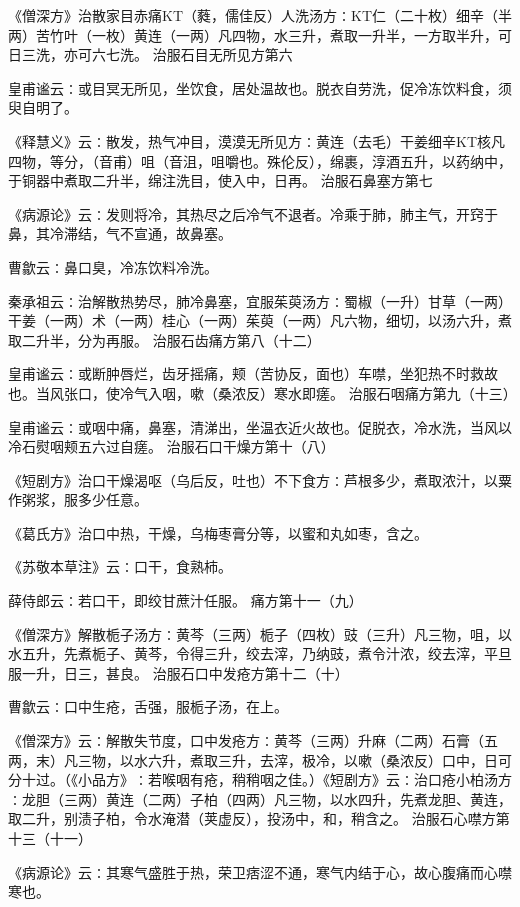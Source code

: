 \documentclass[a4paper,12pt,UTF8,twoside]{ctexbook}
\begin{document}
《僧深方》治散家目赤痛KT（蕤，儒佳反）人洗汤方∶KT仁（二十枚）细辛（半两）苦竹叶（一枚）黄连（一两）凡四物，水三升，煮取一升半，一方取半升，可日三洗，亦可六七洗。
治服石目无所见方第六

皇甫谧云∶或目冥无所见，坐饮食，居处温故也。脱衣自劳洗，促冷冻饮料食，须臾自明了。

《释慧义》云∶散发，热气冲目，漠漠无所见方∶黄连（去毛）干姜细辛KT核凡四物，等分，（音甫）咀（音沮，咀嚼也。殊伦反），绵裹，淳酒五升，以药纳中，于铜器中煮取二升半，绵注洗目，使入中，日再。
治服石鼻塞方第七

《病源论》云∶发则将冷，其热尽之后冷气不退者。冷乘于肺，肺主气，开窍于鼻，其冷滞结，气不宣通，故鼻塞。

曹歙云∶鼻口臭，冷冻饮料冷洗。

秦承祖云∶治解散热势尽，肺冷鼻塞，宜服茱萸汤方∶蜀椒（一升）甘草（一两）干姜（一两）术（一两）桂心（一两）茱萸（一两）凡六物，细切，以汤六升，煮取二升半，分为再服。
治服石齿痛方第八（十二）

皇甫谧云∶或断肿唇烂，齿牙摇痛，颊（苦协反，面也）车噤，坐犯热不时救故也。当风张口，使冷气入咽，嗽（桑浓反）寒水即瘥。
治服石咽痛方第九（十三）

皇甫谧云∶或咽中痛，鼻塞，清涕出，坐温衣近火故也。促脱衣，冷水洗，当风以冷石熨咽颊五六过自瘥。
治服石口干燥方第十（八）

《短剧方》治口干燥渴呕（乌后反，吐也）不下食方∶芦根多少，煮取浓汁，以粟作粥浆，服多少任意。

《葛氏方》治口中热，干燥，乌梅枣膏分等，以蜜和丸如枣，含之。

《苏敬本草注》云∶口干，食熟柿。

薛侍郎云∶若口干，即绞甘蔗汁任服。
痛方第十一（九）

《僧深方》解散栀子汤方∶黄芩（三两）栀子（四枚）豉（三升）凡三物，咀，以水五升，先煮栀子、黄芩，令得三升，绞去滓，乃纳豉，煮令汁浓，绞去滓，平旦服一升，日三，甚良。
治服石口中发疮方第十二（十）

曹歙云∶口中生疮，舌强，服栀子汤，在上。

《僧深方》云∶解散失节度，口中发疮方∶黄芩（三两）升麻（二两）石膏（五两，末）凡三物，以水六升，煮取三升，去滓，极冷，以嗽（桑浓反）口中，日可分十过。（《小品方》∶若喉咽有疮，稍稍咽之佳。）《短剧方》云∶治口疮小柏汤方∶龙胆（三两）黄连（二两）子柏（四两）凡三物，以水四升，先煮龙胆、黄连，取二升，别渍子柏，令水淹潜（荚虚反），投汤中，和，稍含之。
治服石心噤方第十三（十一）

《病源论》云∶其寒气盛胜于热，荣卫痞涩不通，寒气内结于心，故心腹痛而心噤寒也。
\end{document}
